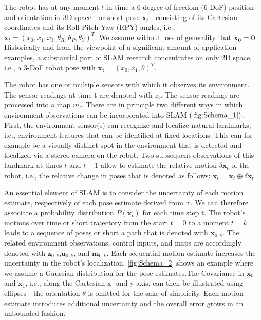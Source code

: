\documentclass[english]{article}
\begin{document}
The robot has at any moment $t$ in time a 6 degree of freedom (6-DoF) 
position and orientation in 3D 
space - or short pose $\mathbf{x}_{t}$ - consisting of its Cartesian 
coordinates and its Roll-Pitch-Yaw (RPY) angles, i.e., $\mathbf{x}_{t} =
(x_{0},x_{1},x_{3},\theta_{R},\theta_{P},\theta_{Y})^{T}$. We assume 
without loss of generality that $\mathbf{x_{0} = 0}$. Historically and from 
the viewpoint of a significant amount of application examples, a
substantial part of SLAM research concentrates on only 2D space, i.e., a
3-DoF robot pose with $\mathbf{x_{t}} = (x_{0},x_{1},\theta)^T$.

The robot has one or multiple sensors with which it observes its environment.  
The sensor readings at time t are denoted with ${z}_{t}$.  The sensor readings 
are processed into a map ${m}_{t}$.  There are in principle two different ways 
in which environment observations can be incorporated into SLAM 
$\left(\cref{fig:Schema_1}\right)$.  First, the environment sensor(s) can 
recognize and localize natural landmarks, i.e., environment features that can be 
identified at fixed locations.  This can for example be a visually distinct spot 
in the environment that is detected and localized via a stereo camera on the 
robot.  Two subsequent observations of this landmark at times $t$ and $t + 1$ 
allow to estimate the relative motion $\delta\mathbf{x}_{t}$ of the robot, i.e., 
the relative change in poses that is denoted as follows: 
$\mathbf{x}_{t}=\mathbf{x}_{t}\oplus\delta\mathbf{x}_{t}$.

An essential element of SLAM is to consider the uncertainty of each motion 
estimate, respectively of each pose estimate derived from it.  We can therefore 
associate a probability distribution $P(\mathbf{x}_t)$ for each time step t.  
The robot’s motions over time or short trajectory from the start $t= 0$ to a 
moment $t=k$ leads to a sequence of poses or short a path that is denoted with 
$\mathbf{x}_{0:k}$.  The related environment observations,  control inputs,  and 
maps are accordingly denoted with $\mathbf{z}_{0:k}$,$\mathbf{u}_{0:k}$, and 
$\mathbf{m}_{0:k}$.  Each sequential motion estimate increases the uncertainty 
in the robot’s  localization. \cref{fig:Schema_2} shows  an  example  where  we  
assume  a  Gaussian  distribution  for  the  pose  estimates.The Covariance in 
$\mathbf{x}_{0}$ and $\mathbf{x}_{1}$, i.e., along the Cartesian x- and y-axis, 
can then be illustrated using ellipses - the orientation $\theta$ is omitted for 
the sake of simplicity.  Each motion estimate introduces additional uncertainty 
and the overall error grows in an unbounded fashion.
\end{document}
